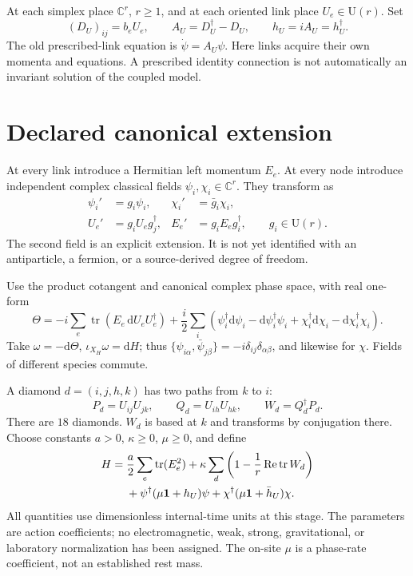 \documentclass[11pt,a4paper]{article}
\newcommand{\tr}{\operatorname{tr}}\newcommand{\Rea}{\operatorname{Re}}\newcommand{\Ima}{\operatorname{Im}}
\newcommand{\U}{\mathrm U}\newcommand{\id}{\mathbf1}\newcommand{\dd}{\mathrm d}
\begin{document}
At each simplex place $\mathbb C^r$, $r\geq1$, and at each oriented link place $U_e\in\U(r)$. Set
\[
 (D_U)_{ij}=b_eU_e,\qquad A_U=D_U^\dagger-D_U,
 \qquad h_U=iA_U=h_U^\dagger.
\]
The old prescribed-link equation is $\dot\psi=A_U\psi$. Here links acquire their own momenta and equations. A prescribed identity connection is not automatically an invariant solution of the coupled model.

\newpage
\section{Declared canonical extension}
At every link introduce a Hermitian left momentum $E_e$. At every node introduce independent complex classical fields $\psi_i,\chi_i\in\mathbb C^r$. They transform as
\begin{align}
\psi_i'&=g_i\psi_i,&\chi_i'&=\bar g_i\chi_i,\\
U_e'&=g_iU_eg_j^\dagger,&E_e'&=g_iE_eg_i^\dagger,
\qquad g_i\in\U(r).
\end{align}
The second field is an explicit extension. It is not yet identified with an antiparticle, a fermion, or a source-derived degree of freedom.

Use the product cotangent and canonical complex phase space, with real one-form
\begin{equation}
\Theta=-i\sum_e\tr(E_e\,\dd U_eU_e^\dagger)
+\frac{i}{2}\sum_i\left(\psi_i^\dagger\dd\psi_i-\dd\psi_i^\dagger\psi_i
+\chi_i^\dagger\dd\chi_i-\dd\chi_i^\dagger\chi_i\right).
\end{equation}
Take $\omega=-\dd\Theta$, $\iota_{X_H}\omega=\dd H$; thus
$\{\psi_{i\alpha},\bar\psi_{j\beta}\}=-i\delta_{ij}\delta_{\alpha\beta}$,
and likewise for $\chi$. Fields of different species commute.

A diamond $d=(i,j,h,k)$ has two paths from $k$ to $i$:
\[
 P_d=U_{ij}U_{jk},\qquad Q_d=U_{ih}U_{hk},\qquad W_d=Q_d^\dagger P_d.
\]
There are $18$ diamonds. $W_d$ is based at $k$ and transforms by conjugation there. Choose constants $a>0$, $\kappa\geq0$, $\mu\geq0$, and define
\begin{align}
H={}&\frac a2\sum_e\tr(E_e^2)
+\kappa\sum_d\left(1-\frac1r\Rea\tr W_d\right)\notag\\
&+\psi^\dagger(\mu\id+h_U)\psi
+\chi^\dagger(\mu\id+\bar h_U)\chi. \label{eq:H}
\end{align}
All quantities use dimensionless internal-time units at this stage. The parameters are action coefficients; no electromagnetic, weak, strong, gravitational, or laboratory normalization has been assigned. The on-site $\mu$ is a phase-rate coefficient, not an established rest mass.
\end{document}
